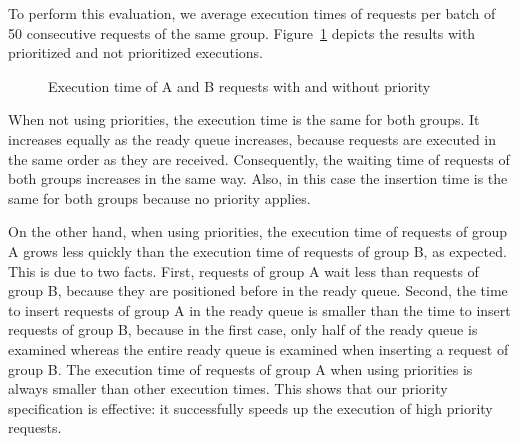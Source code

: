 \documentclass[11pt]{report}
\begin{document}
To perform this evaluation, we average execution times of requests per batch of 50 consecutive requests of the same group. Figure~\ref{fig:effectivity} depicts the results with prioritized and not prioritized executions.
\begin{figure}[!ht]
      \caption{Execution time of A and B requests with and without priority}
      \label{fig:effectivity} 
\end{figure}
When not using priorities, the execution time is the same for both groups. It increases equally as the ready queue increases, because requests are executed in the same order as they are received. Consequently, the waiting time of requests of both groups increases in the same way. Also, in this case the insertion time is the same for both groups because no priority applies.

On the other hand, when using priorities, the execution time of requests of group A grows less quickly than the execution time of requests of group B, as expected. This is due to two facts. First, requests of group A wait less than requests of group B, because they are positioned before in the ready queue. Second, the time to insert requests of group A in the ready queue is smaller than the time to insert requests of group B, because in the first case, only half of the ready queue is examined whereas the entire ready queue is examined when inserting a request of group B. The execution time of requests of group A when using priorities is always smaller than other execution times. This shows that our priority specification is effective: it successfully speeds up the execution of high priority requests. 
\end{document}
